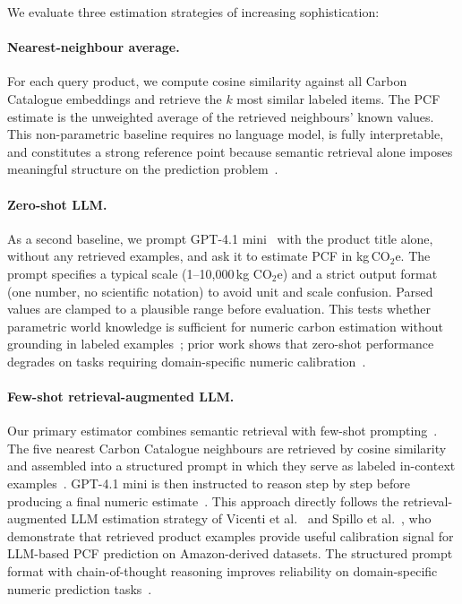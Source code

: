 \documentclass[11pt]{article}
\begin{document}
We evaluate three estimation strategies of increasing sophistication:

\paragraph{Nearest-neighbour average.}
For each query product, we compute cosine similarity against all Carbon
Catalogue embeddings and retrieve the $k$ most similar labeled items.
The PCF estimate is the unweighted average of the retrieved neighbours'
known values. This non-parametric baseline requires no language model,
is fully interpretable, and constitutes a strong reference point because
semantic retrieval alone imposes meaningful structure on the prediction
problem~\cite{gao2023ragsurvey}.

\paragraph{Zero-shot LLM.}
As a second baseline, we prompt GPT-4.1 mini~\cite{openai2025gpt41mini}
with the product title alone, without any retrieved examples, and ask it
to estimate PCF in kg\,CO$_2$e. The prompt specifies a typical scale
(1--10{,}000\,kg CO$_2$e) and a strict output format (one number, no
scientific notation) to avoid unit and scale confusion. Parsed values
are clamped to a plausible range before evaluation. This tests whether
parametric world knowledge is sufficient for numeric carbon estimation
without grounding in labeled examples~\cite{brown2020gpt3}; prior work
shows that zero-shot performance degrades on tasks requiring
domain-specific numeric calibration~\cite{dong2022icl}.

\paragraph{Few-shot retrieval-augmented LLM.}
Our primary estimator combines semantic retrieval with few-shot
prompting~\cite{brown2020gpt3, dong2022icl}. The five nearest Carbon
Catalogue neighbours are retrieved by cosine similarity and assembled
into a structured prompt in which they serve as labeled in-context
examples~\cite{gao2023ragsurvey}. GPT-4.1 mini is then instructed to
reason step by step before producing a final numeric
estimate~\cite{wei2022cot}. This approach directly follows the
retrieval-augmented LLM estimation strategy of Vicenti et
al.~\cite{vicenti2026pcfllm} and Spillo et al.~\cite{ecoa2026}, who
demonstrate that retrieved product examples provide useful calibration
signal for LLM-based PCF prediction on Amazon-derived datasets. The
structured prompt format with chain-of-thought reasoning improves
reliability on domain-specific numeric prediction
tasks~\cite{hegselmann2023tabllm, wei2022cot}.
\end{document}
